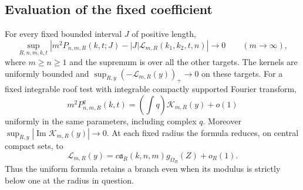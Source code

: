 \subsection{Evaluation of the fixed coefficient}
\begin{theorem}
\label{thm:v41-uniform-transition}
For every fixed bounded interval $J$ of positive length,
\begin{equation}\label{eq:v41-uniform-interval}
 \sup_{R,n,m,k,t}
 \left|m^2P_{n,m,R}(k,t;J)-|J|\mathcal L_{m,R}(k_1,k_2,t,n)\right|
                         \longrightarrow0\qquad(m\to\infty),
\end{equation}
where $m\ge n\ge1$ and the supremum is over all the other targets.
The kernels are uniformly bounded and
$\sup_{R,y}(-\mathcal L_{m,R}(y))_+\to0$ on these targets.
For a fixed integrable roof test with integrable compactly supported
Fourier transform,
\begin{equation}\label{eq:v41-uniform-test}
 m^2P^q_{n,m,R}(k,t)=\left(\int q\right)\mathcal K_{m,R}(y)+o(1)
\end{equation}
uniformly in the same parameters, including complex $q$. Moreover
$\sup_{R,y}|\operatorname{Im}\mathcal K_{m,R}(y)|\to0$.
At each fixed radius the formula reduces, on central compact sets, to
\[
 \mathcal L_{m,R}(y)
       =c\mathfrak a_R(k,n,m)g_{\Omega_R}(Z)+o_R(1).
\]
Thus the uniform formula retains a branch even when its modulus is
strictly below one at the radius in question.
\end{theorem}
